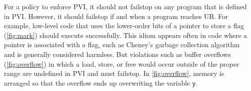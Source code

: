 \documentclass{llncs}
\begin{document}
For a policy to enforce PVI, it should not failstop on any program that is defined in PVI.
However, it should failstop if and when a program reaches UB. For example, low-level code
that uses the lower-order bits of a pointer to store a flag (\cref{fig:mark}) should
execute successfully. This idiom appears often in code where a pointer is associated with a flag,
such as Cheney's garbage collection algorithm \cite{} and is generally considered harmless.
But violations such as buffer overflows (\cref{fig:overflow}) in which a load, store, or free would
occur outside of the proper range are undefined in PVI and must failstop. In \cref{fig:overflow},
memory is arranged so that the overflow ends up overwriting the variable {\tt y}.

\end{document}
